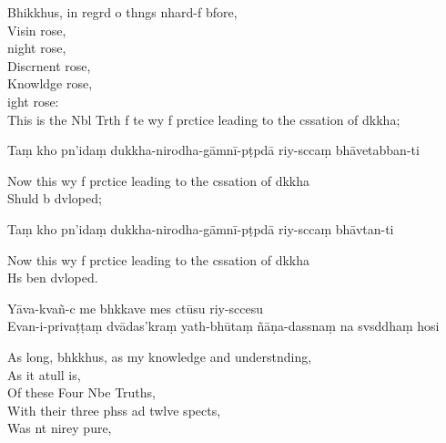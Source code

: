 \begin{english}
  Bhikkhus, in regrd o thngs nhard-f bfore,\\
  Visin rose,\\
  night rose,\\
  Discrnent rose,\\
  Knowldge rose,\\
  ight rose:\\
  This is the Nbl Trth f te wy f prctice leading to the cssation of dkkha;
\end{english}

Taṃ kho pn'idaṃ dukkha-nirodha-gāmnī-pṭpdā riy-sccaṃ bhāvetabban-ti

\begin{english}
  Now this wy f prctice leading to the cssation of dkkha\\
  Shuld b dvloped;
\end{english}

Taṃ kho pn'idaṃ dukkha-nirodha-gāmnī-pṭpdā riy-sccaṃ bhāvtan-ti

\begin{english}
  Now this wy f prctice leading to the cssation of dkkha\\
  Hs ben dvloped.
\end{english}

Yāva-kvañ-c me bhkkave mes ctūsu riy-sccesu\\
Evan-i-privaṭṭaṃ dvādas'kraṃ yath-bhūtaṃ ñāṇa-dassnaṃ na svsddhaṃ hosi

\begin{english}
  As long, bhkkhus, as my knowledge and understnding,\\
  As it atull is,\\
  Of these Four Nbe Truths,\\
  With their three phss ad twlve spects,\\
  Was nt nirey pure,
\end{english}

